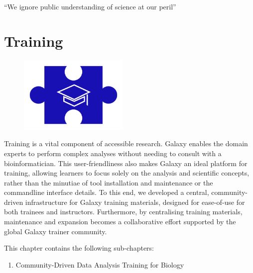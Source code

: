 \cleartorightpage
\begin{savequote}[75mm]
``We ignore public understanding of science at our peril''
\end{savequote}

\chapter{Training}\label{chapter:training}

\begin{figure}[t!]
\includegraphics[height=10em]{frontmatter/images/chapter-header-training.png}
\end{figure}
\setcounter{figure}{-1}
\setcounter{table}{-1}
\setcounter{section}{-1}

Training is a vital component of accessible research. Galaxy enables the domain experts to perform complex analyses without needing to consult with a bioinformatician. This user-friendliness also makes Galaxy an ideal platform for training, allowing learners to focus solely on the analysis and scientific concepts, rather than the minutiae of tool installation and maintenance or the commandline interface details. To this end, we developed a central, community-driven infrastructure for Galaxy training materials, designed for ease-of-use for both trainees and instructors. Furthermore, by centralising training materials, maintenance and expansion becomes a collaborative effort supported by the global Galaxy trainer community.

This chapter contains the following sub-chapters:

\begin{enumerate}[label=\ref{chapter:training}.\arabic*]
\itemsep-0.5em
\setcounter{enumi}{-1}
\item Community-Driven Data Analysis Training for Biology
\end{enumerate}
